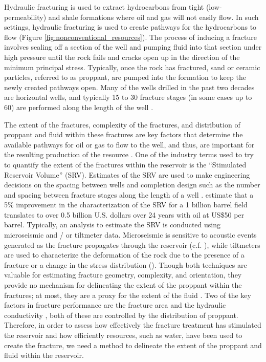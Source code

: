 Hydraulic fracturing is used to extract hydrocarbons from tight (low-permeability) and shale formations where oil and gas will not easily flow. In such settings, hydraulic fracturing is used to create pathways for the hydrocarbons to flow (Figure \ref{fig:nonconventional_resources}). The process of inducing a fracture involves sealing off a section of the well and pumping fluid into that section under high pressure until the rock fails and cracks open up in the direction of the minimum principal stress. Typically, once the rock has fractured, sand or ceramic particles, referred to as proppant, are pumped into the formation to keep the newly created pathways open. Many of the wells drilled in the past two decades are horizontal wells, and typically 15 to 30 fracture stages (in some cases up to 60) are performed along the length of the well \citep{Maxwell2014}.

The extent of the fractures, complexity of the fractures, and distribution of proppant and fluid within these fractures are key factors that determine the available pathways for oil or gas to flow to the well, and thus, are important for the resulting production of the resource \citep{Brannon2008, Cipolla2009}. One of the industry terms used to try to quantify the extent of the fractures within the reservoir is the ``Stimulated Reservoir Volume'' (SRV). Estimates of the SRV are used to make engineering decisions on the spacing between wells and completion design such as the number and spacing between fracture stages along the length of a well \citep{Palisch2016}. \cite{Hoversten2015} estimate that a 5\% improvement in the characterization of the SRV for a 1 billion barrel field translates to over 0.5 billion U.S. dollars over 24 years with oil at US\$50 per barrel. Typically, an analysis to estimate the SRV is conducted using microseismic and / or tiltmeter data. Microseismic is sensitive to acoustic events generated as the fracture propagates through the reservoir (c.f. \cite{Mayerhofer2010, Cipolla2009, Maxwell2002, Warpinski1996}), while tiltmeters are used to characterize the deformation of the rock due to the presence of a fracture or a change in the stress distribution (\citep{Mayerhofer2010, Wright1998}). Though both techniques are valuable for estimating fracture geometry, complexity, and orientation, they provide no mechanism for delineating the extent of the proppant within the fractures; at most, they are a proxy for the extent of the fluid \citep{Palisch2016}. Two of the key factors in fracture performance are the fracture area and the hydraulic conductivity \citep{Cipolla2014}, both of these are controlled by the distribution of proppant. Therefore, in order to assess how effectively the fracture treatment has stimulated the reservoir and how efficiently resources, such as water, have been used to create the fracture, we need a method to delineate the extent of the proppant and fluid within the reservoir.


